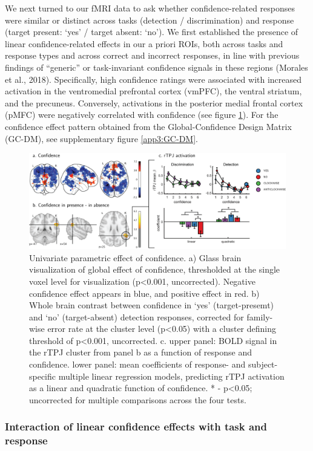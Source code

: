\documentclass[12pt,twoside]{reedthesis}
\begin{document}
We next turned to our fMRI data to ask whether confidence-related responses were similar or distinct across tasks (detection / discrimination) and response (target present: `yes' / target absent: `no'). We first established the presence of linear confidence-related effects in our a priori ROIs, both across tasks and response types and across correct and incorrect responses, in line with previous findings of ``generic'' or task-invariant confidence signals in these regions (Morales et al., 2018). Specifically, high confidence ratings were associated with increased activation in the ventromedial prefrontal cortex (vmPFC), the ventral striatum, and the precuneus. Conversely, activations in the posterior medial frontal cortex (pMFC) were negatively correlated with confidence (see figure \ref{fig:ch3-exp1-globalConf}). For the confidence effect pattern obtained from the Global-Confidence Design Matrix (GC-DM), see supplementary figure \ref{app3:GC-DM}.
\begin{figure}
\includegraphics[width=\linewidth]{figure/ch3/figure3} \caption[Univariate parametric effect of confidence]{Univariate parametric effect of confidence. a) Glass brain visualization of global effect of confidence, thresholded at the single voxel level for visualization (p<0.001, uncorrected). Negative confidence effect appears in blue, and positive effect in red. b) Whole brain contrast between confidence in ‘yes’ (target-presemt) and ‘no’ (target-absent) detection responses, corrected for family-wise error rate at the cluster level (p<0.05) with a cluster defining threshold of p<0.001, uncorrected. c. upper panel: BOLD signal in the rTPJ cluster from panel b as a function of response and confidence. lower panel: mean coefficients of response- and subject-specific multiple linear regression models, predicting rTPJ activation as a linear and quadratic function of confidence.  * - p<0.05; uncorrected for multiple comparisons across the four tests.}\label{fig:ch3-exp1-globalConf}
\end{figure}
\hypertarget{interaction-of-linear-confidence-effects-with-task-and-response}{%
\subsubsection*{Interaction of linear confidence effects with task and response}\label{interaction-of-linear-confidence-effects-with-task-and-response}}
\end{document}
